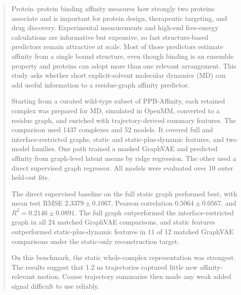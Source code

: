 \begin{abstract}
Protein--protein binding affinity measures how strongly two proteins associate and is important for protein design, therapeutic targeting, and drug discovery. Experimental measurements and high-end free-energy calculations are informative but expensive, so fast structure-based predictors remain attractive at scale. Most of those predictors estimate affinity from a single bound structure, even though binding is an ensemble property and proteins can adopt more than one relevant arrangement. This study asks whether short explicit-solvent molecular dynamics (MD) can add useful information to a residue-graph affinity predictor.

Starting from a curated wild-type subset of PPB-Affinity, each retained complex was prepared for MD, simulated in OpenMM, converted to a residue graph, and enriched with trajectory-derived summary features. The comparison used 1437 complexes and 52 models. It covered full and interface-restricted graphs, static and static-plus-dynamic features, and two model families. One path trained a masked GraphVAE and predicted affinity from graph-level latent means by ridge regression. The other used a direct supervised graph regressor. All models were evaluated over 10 outer held-out fits.

The direct supervised baseline on the full static graph performed best, with mean test RMSE $2.3379 \pm 0.1067$, Pearson correlation $0.5064 \pm 0.0567$, and $R^2 = 0.2146 \pm 0.0891$. The full graph outperformed the interface-restricted graph in all 24 matched GraphVAE comparisons, and static features outperformed static-plus-dynamic features in 11 of 12 matched GraphVAE comparisons under the static-only reconstruction target.

On this benchmark, the static whole-complex representation was strongest. The results suggest that 1.2 ns trajectories captured little new affinity-relevant motion. Coarse trajectory summaries then made any weak added signal difficult to use reliably.
\end{abstract}
